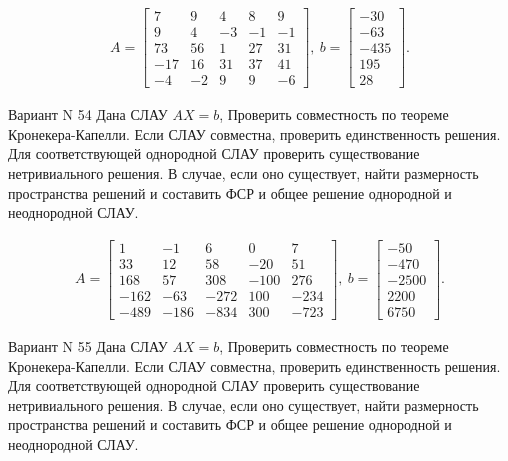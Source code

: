 \documentclass[11pt]{report}
\begin{document}
\begin{align*}
 A = \left[\begin{matrix}7 & 9 & 4 & 8 & 9\\9 & 4 & -3 & -1 & -1\\73 & 56 & 1 & 27 & 31\\-17 & 16 & 31 & 37 & 41\\-4 & -2 & 9 & 9 & -6\end{matrix}\right],
\ b = \left[\begin{matrix}-30\\-63\\-435\\195\\28\end{matrix}\right]. 
 \end{align*}

Вариант N 54
Дана СЛАУ $AX = b$,
Проверить совместность по теореме Кронекера-Капелли. Если СЛАУ совместна, проверить единственность решения.
Для соответствующей однородной СЛАУ проверить существование нетривиального решения. В случае, если оно существует,
найти размерность пространства решений и составить ФСР и общее решение однородной  и неоднородной СЛАУ.


\begin{align*}
 A = \left[\begin{matrix}1 & -1 & 6 & 0 & 7\\33 & 12 & 58 & -20 & 51\\168 & 57 & 308 & -100 & 276\\-162 & -63 & -272 & 100 & -234\\-489 & -186 & -834 & 300 & -723\end{matrix}\right],
\ b = \left[\begin{matrix}-50\\-470\\-2500\\2200\\6750\end{matrix}\right]. 
 \end{align*}

Вариант N 55
Дана СЛАУ $AX = b$,
Проверить совместность по теореме Кронекера-Капелли. Если СЛАУ совместна, проверить единственность решения.
Для соответствующей однородной СЛАУ проверить существование нетривиального решения. В случае, если оно существует,
найти размерность пространства решений и составить ФСР и общее решение однородной  и неоднородной СЛАУ.
\end{document}
